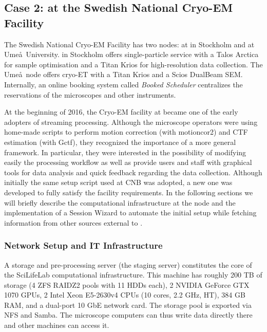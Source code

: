 
\subsection{Case 2: \scipion at the Swedish National Cryo-EM Facility}

The Swedish National Cryo-EM Facility %
has two nodes: at \scilifelab in Stockholm and at Ume\aa\ University. \scilifelab in Stockholm offers single-particle service with a 
Talos Arctica for sample optimisation and a Titan Krios for high-resolution data collection. The Ume\aa\ node offers cryo-ET with a Titan Krios and a Scios DualBeam SEM.
Internally, an online booking system called \emph{Booked Scheduler} centralizes the reservations of the microscopes and other instruments. 

At the beginning of 2016, the Cryo-EM facility at \scilifelab became one of the early adopters of \scipion streaming processing. Although the microscope operators were using home-made scripts to perform motion correction (with motioncor2) and CTF estimation (with Gctf), they recognized the importance of a more general
framework. In particular, they were interested in the possibility of modifying easily the processing workflow as well as provide users and staff with  graphical tools for data analysis and quick feedback regarding the data collection.
Although initially the same setup script used at
CNB was adopted, a new one was developed to fully satisfy the facility
requirements. In the following sections we will briefly describe the computational infrastructure at the \scilifelab node and the implementation of a Session Wizard to automate the initial setup while fetching information from other sources external to \scipion. %

\subsubsection{Network Setup and IT Infrastructure}
A storage and pre-processing server (the staging
server) constitutes the core of the SciLifeLab computational infrastructure.
 This machine has roughly 200 TB of storage (4 ZFS RAIDZ2 pools with 11 HDDs each), 2 NVIDIA GeForce GTX 1070 GPUs, 2 Intel Xeon E5-2630v4 CPUs (10 cores, 2.2 GHz, HT), 384 GB RAM, and a dual-port 10 GbE network card. The storage pool is exported via NFS and Samba. The microscope computers can thus write data directly there and other machines can access it.
 
